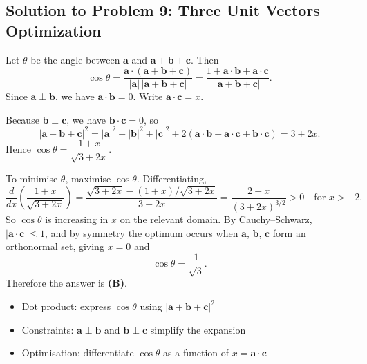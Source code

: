 \subsection{Solution to Problem 9: Three Unit Vectors Optimization}

\begin{solution}
Let $\theta$ be the angle between $\mathbf{a}$ and $\mathbf{a}+\mathbf{b}+\mathbf{c}$. Then
\[
\cos\theta = \frac{\mathbf{a}\cdot(\mathbf{a}+\mathbf{b}+\mathbf{c})}{|\mathbf{a}|\,|\mathbf{a}+\mathbf{b}+\mathbf{c}|}
= \frac{1 + \mathbf{a}\cdot\mathbf{b} + \mathbf{a}\cdot\mathbf{c}}{|\mathbf{a}+\mathbf{b}+\mathbf{c}|}.
\]
Since $\mathbf{a}\perp\mathbf{b}$, we have $\mathbf{a}\cdot\mathbf{b}=0$. Write $\mathbf{a}\cdot\mathbf{c}=x$.

Because $\mathbf{b}\perp\mathbf{c}$, we have $\mathbf{b}\cdot\mathbf{c}=0$, so
\[
|\mathbf{a}+\mathbf{b}+\mathbf{c}|^2
= |\mathbf{a}|^2 + |\mathbf{b}|^2 + |\mathbf{c}|^2 + 2(\mathbf{a}\cdot\mathbf{b}+\mathbf{a}\cdot\mathbf{c}+\mathbf{b}\cdot\mathbf{c})
= 3 + 2x.
\]
Hence $\cos\theta = \dfrac{1+x}{\sqrt{3+2x}}$.

To minimise $\theta$, maximise $\cos\theta$. Differentiating,
\[
\frac{d}{dx}\left(\frac{1+x}{\sqrt{3+2x}}\right)
= \frac{\sqrt{3+2x} - (1+x)/\sqrt{3+2x}}{3+2x}
= \frac{2+x}{(3+2x)^{3/2}} > 0 \quad \text{for } x > -2.
\]
So $\cos\theta$ is increasing in $x$ on the relevant domain. By Cauchy--Schwarz, $|\mathbf{a}\cdot\mathbf{c}| \le 1$, and by symmetry the optimum occurs when $\mathbf{a}$, $\mathbf{b}$, $\mathbf{c}$ form an orthonormal set, giving $x=0$ and
\[
\cos\theta = \frac{1}{\sqrt{3}}.
\]
Therefore the answer is \textbf{(B)}.
\end{solution}

\begin{takeaways}
\begin{itemize}
    \item Dot product: express $\cos\theta$ using $|\mathbf{a}+\mathbf{b}+\mathbf{c}|^2$
    \item Constraints: $\mathbf{a}\perp\mathbf{b}$ and $\mathbf{b}\perp\mathbf{c}$ simplify the expansion
    \item Optimisation: differentiate $\cos\theta$ as a function of $x=\mathbf{a}\cdot\mathbf{c}$
\end{itemize}
\end{takeaways}
